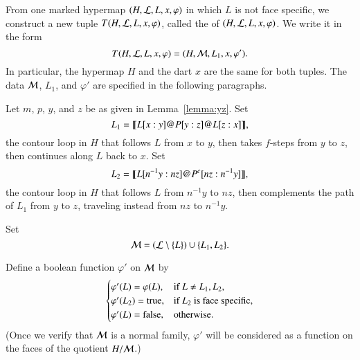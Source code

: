 \begin{definition}[transform]
  From one marked hypermap $(H,{\cal L},L,x,\varphi)$ in which $L$ is
  not face specific, we construct a new tuple
  $T(H,{\cal{L}},L,x,\varphi)$, called the  of
  $(H,{\cal{L}},L,x,\varphi)$.  We write it in the form
\begin{displaymath}
T(H,{\cal L},L,x,\varphi) = (H,{\cal M},L_1,x,\varphi').
\end{displaymath}
In particular, the hypermap $H$ and the dart $x$ are the same for both
tuples.  The data ${\cal M}$, $L_1$, and $\varphi'$ are specified in
the following paragraphs.
\end{definition}

Let $m$, $p$, $y$, and $z$ be as given in
Lemma~\ref{lemma:yz}.
Set
\begin{displaymath}
L_1 = {\llbracket{L[x:y] {{\operatorname{@}}}P[y:z] {{\operatorname{@}}}L[z:x]}\rrbracket},
\end{displaymath}
the contour loop in $H$ that follows $L$ from $x$ to $y$, then takes
$f$-steps from $y$ to $z$, then continues along $L$ back to $x$.  
Set 
\begin{displaymath}
L_2 = {\llbracket{L[n^{-1}y:n z] {{\operatorname{@}}}P^c[n z:n^{-1}y]}\rrbracket},
\end{displaymath}
the contour loop in $H$ that follows $L$ from $n^{-1} y$ to $n z$,
then complements the path of $L_1$ from $y$ to $z$, traveling instead
from $n z$ to $n^{-1} y$. 


Set
\begin{displaymath}{\cal M} = ({\cal L}\setminus \{L\}) \cup
\{L_1,L_2\}.\end{displaymath}

Define a boolean function $\varphi'$
on $\cal M$ by
\begin{displaymath}
\begin{cases}
\varphi'(L) = \varphi(L), &\text{if } L\ne L_1,L_2,\\
\varphi'(L_2) = {\operatorname{true}}, &\text{if $L_2$ is face specific},\\
\varphi'(L) = {\operatorname{false}}, &\text{otherwise}.\\
\end{cases}
\end{displaymath}
(Once we verify that ${\cal M}$ is a
normal family,  $\varphi'$ will be considered as a function on
the faces of the quotient $H/{\cal M}$.)  
%
%




